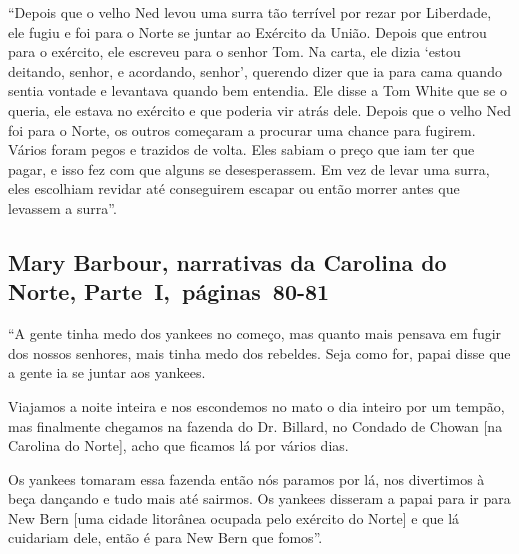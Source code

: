 ``Depois que o velho Ned levou uma surra tão terrível por rezar por
Liberdade, ele fugiu e foi para o Norte se juntar ao Exército da União.
Depois que entrou para o exército, ele escreveu para o senhor Tom. Na
carta, ele dizia `estou deitando, senhor, e acordando, senhor', querendo
dizer que ia para cama quando sentia vontade e levantava quando bem
entendia. Ele disse a Tom White que se o queria, ele estava no exército
e que poderia vir atrás dele. Depois que o velho Ned foi para o Norte,
os outros começaram a procurar uma chance para fugirem. Vários foram
pegos e trazidos de volta. Eles sabiam o preço que iam ter que pagar, e
isso fez com que alguns se desesperassem. Em vez de levar uma surra,
eles escolhiam revidar até conseguirem escapar ou então morrer antes
que levassem a surra''.

\subsection{Mary Barbour, narrativas da Carolina do Norte, Parte~I,~páginas~80-81} \label{ref15}

``A gente tinha medo dos yankees no começo, mas quanto mais pensava em
fugir dos nossos senhores, mais tinha medo dos rebeldes. Seja como for,
papai disse que a gente ia se juntar aos yankees.

Viajamos a noite inteira e nos escondemos no mato o dia inteiro por um
tempão, mas finalmente chegamos na fazenda do Dr. Billard, no Condado de
Chowan {[}na Carolina do Norte{]}, acho que ficamos lá por vários dias.

Os yankees tomaram essa fazenda então nós paramos por lá, nos divertimos
à beça dançando e tudo mais até sairmos. Os yankees disseram a papai
para ir para New Bern {[}uma cidade litorânea ocupada pelo exército do
Norte{]} e que lá cuidariam dele, então é para New Bern que fomos''.

\pagebreak
\thispagestyle{empty}
\movetoevenpage
\thispagestyle{empty}

